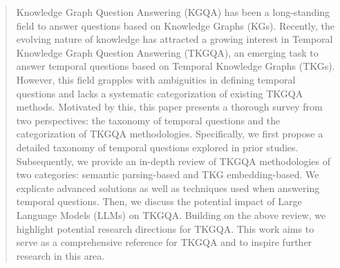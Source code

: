 \begin{abstract}
Knowledge Graph Question Answering (KGQA) has been a long-standing field to answer questions based on Knowledge Graphs (KGs). Recently, the evolving nature of knowledge has attracted a growing interest in Temporal Knowledge Graph Question Answering (TKGQA), an emerging task to answer temporal questions based on Temporal Knowledge Graphs (TKGs). However, this field grapples with ambiguities in defining temporal questions and lacks a systematic categorization of existing TKGQA methods. Motivated by this, this paper presents a thorough survey from two perspectives: the taxonomy of temporal questions and the categorization of TKGQA methodologies. Specifically, we first propose a detailed taxonomy of temporal questions explored in prior studies. Subsequently, we provide an in-depth review of TKGQA methodologies of two categories: semantic parsing-based and TKG embedding-based. 
We explicate advanced solutions as well as techniques used when answering temporal questions. Then, we discuss the potential impact of Large Language Models (LLMs) on TKGQA.
Building on the above review, we highlight potential research directions for TKGQA. This work aims to serve as a comprehensive reference for TKGQA and to inspire further research in this area.
\end{abstract}